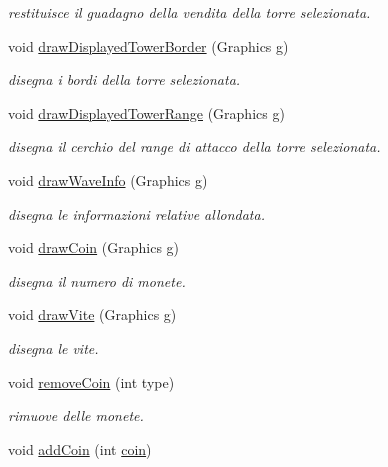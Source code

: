\begin{DoxyCompactItemize}
\begin{DoxyCompactList}\small\item\em restituisce il guadagno della vendita della torre selezionata. \end{DoxyCompactList}\item 
void \hyperlink{classui_1_1_action_bar_a04a438da46ac439f00343a12939ada6e}{draw\+Displayed\+Tower\+Border} (Graphics g)
\begin{DoxyCompactList}\small\item\em disegna i bordi della torre selezionata. \end{DoxyCompactList}\item 
void \hyperlink{classui_1_1_action_bar_a1f012512b669e57c49c1957905a35107}{draw\+Displayed\+Tower\+Range} (Graphics g)
\begin{DoxyCompactList}\small\item\em disegna il cerchio del range di attacco della torre selezionata. \end{DoxyCompactList}\item 
void \hyperlink{classui_1_1_action_bar_a4202926f30a7290c360bfcd4af6b03cb}{draw\+Wave\+Info} (Graphics g)
\begin{DoxyCompactList}\small\item\em disegna le informazioni relative all\textquotesingle{}ondata. \end{DoxyCompactList}\item 
void \hyperlink{classui_1_1_action_bar_ae07c200235fb700738b8194a93dbb8fb}{draw\+Coin} (Graphics g)
\begin{DoxyCompactList}\small\item\em disegna il numero di monete. \end{DoxyCompactList}\item 
void \hyperlink{classui_1_1_action_bar_a7075e1ba9a7135d89d02dca2e3b8860e}{draw\+Vite} (Graphics g)
\begin{DoxyCompactList}\small\item\em disegna le vite. \end{DoxyCompactList}\item 
void \hyperlink{classui_1_1_action_bar_a99a8282ac7383f267261ca608cafe139}{remove\+Coin} (int type)
\begin{DoxyCompactList}\small\item\em rimuove delle monete. \end{DoxyCompactList}\item 
void \hyperlink{classui_1_1_action_bar_a8e9e4227428708da489e0b37223377a8}{add\+Coin} (int \hyperlink{classui_1_1_action_bar_a41de228368d6181324d7bfbdf40875e3}{coin})

\end{DoxyCompactItemize}
